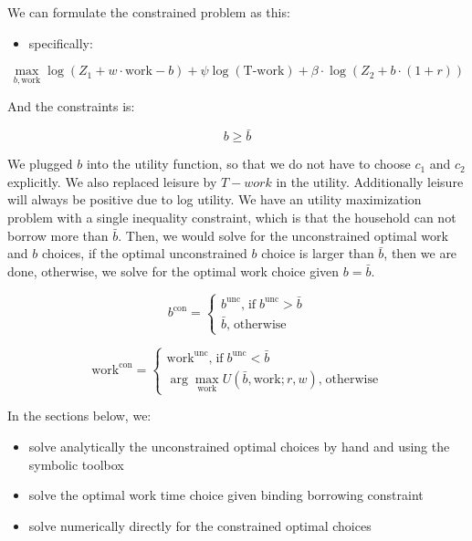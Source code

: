 \documentclass[
]{book}
\providecommand{\tightlist}{%
  \setlength{\itemsep}{0pt}\setlength{\parskip}{0pt}}
\begin{document}
We can formulate the constrained problem as this:

\begin{itemize}
\tightlist
\item
  specifically:
\end{itemize}

\[\max_{b,\textrm{work}} \log (Z_1 +w\cdot \textrm{work}-b)+\psi \log (\textrm{T}\textrm{-}\textrm{work})+\beta \cdot \log (Z_2 +b\cdot (1+r))\]

And the constraints is:

\[b\ge \bar{b}\]

We plugged \(b\) into the utility function, so that we do not have to
choose \(c_1\) and \(c_2\) explicitly. We also replaced leisure by \(T-work\)
in the utility. Additionally leisure will always be positive due to log
utility. We have an utility maximization problem with a single
inequality constraint, which is that the household can not borrow more
than \(\bar{b}\). Then, we would solve for the unconstrained optimal work
and \(b\) choices, if the optimal unconstrained \(b\) choice is larger than
\(\bar{b}\), then we are done, otherwise, we solve for the optimal work
choice given \(b=\bar{b}\).

\[b^{\textrm{con}} =\left\lbrace \begin{array}{c}
b^{\textrm{unc}} \textrm{,}\;\textrm{if}\;b^{\textrm{unc}} >\bar{b} \\
\bar{b} \textrm{,}\;\textrm{otherwise}
\end{array}\right.\]

\[{\textrm{work}}^{\textrm{con}} =\left\lbrace \begin{array}{c}
{\textrm{work}}^{\textrm{unc}} \textrm{,}\;\textrm{if}\;b^{\textrm{unc}} <\bar{b} \\
\arg \max_{\textrm{work}} U\left(\bar{b} ,\textrm{work};r,w\right)\textrm{,}\;\textrm{otherwise}
\end{array}\right.\]

In the sections below, we:

\begin{itemize}
\item
  solve analytically the unconstrained optimal choices by hand and
  using the symbolic toolbox
\item
  solve the optimal work time choice given binding borrowing
  constraint
\item
  solve numerically directly for the constrained optimal choices
\end{itemize}
\end{document}
